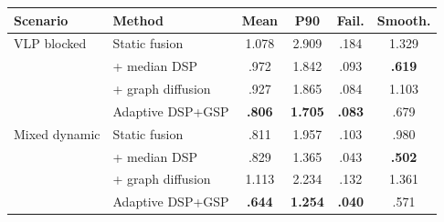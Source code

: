 \begin{tabular}{@{}llcccc@{}}
\toprule
Scenario & Method & Mean & P90 & Fail. & Smooth. \\
\midrule
VLP blocked & Static fusion & 1.078 & 2.909 & .184 & 1.329 \\
 & + median DSP & .972 & 1.842 & .093 & \textbf{.619} \\
 & + graph diffusion & .927 & 1.865 & .084 & 1.103 \\
 & Adaptive DSP+GSP & \textbf{.806} & \textbf{1.705} & \textbf{.083} & .679 \\
\midrule
Mixed dynamic & Static fusion & .811 & 1.957 & .103 & .980 \\
 & + median DSP & .829 & 1.365 & .043 & \textbf{.502} \\
 & + graph diffusion & 1.113 & 2.234 & .132 & 1.361 \\
 & Adaptive DSP+GSP & \textbf{.644} & \textbf{1.254} & \textbf{.040} & .571 \\
\bottomrule
\end{tabular}
